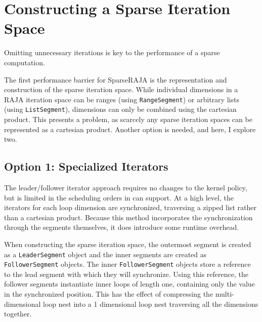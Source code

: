 \section{Constructing a Sparse Iteration Space}\label{sec:sparseIterspace}
Omitting unnecessary iterations is key to the performance of a sparse computation. 


The first performance barrier for SparseRAJA is the representation and construction of the sparse iteration space.
While individual dimensions in a RAJA iteration space can be ranges (using \verb.RangeSegment.) or arbitrary lists (using \verb.ListSegment.), dimensions can only be combined using the cartesian product. 
This presents a problem, as scarcely any sparse iteration spaces can be represented as a cartesian product.
Another option is needed, and here, I explore two.

\subsection{Option 1: Specialized Iterators}
The leader/follower iterator approach requires no changes to the kernel policy, but is limited in the scheduling orders in can support. 
At a high level, the iterators for each loop dimension are synchronized, traversing a zipped list rather than a cartesian product. 
Because this method incorporates the synchronization through the segments themselves, it does introduce some runtime overhead.

When constructing the sparse iteration space, the outermost segment is created as a \verb.LeaderSegment. object and the inner segments are created as \verb.FollowerSegment. objects.
The inner \verb.FollowerSegment. objects store a reference to the lead segment with which they will synchronize.
Using this reference, the follower segments instantiate inner loops of length one, containing only the value in the synchronized position. 
This has the effect of compressing the multi-dimensional loop nest into a 1 dimensional loop nest traversing all the dimensions together.

